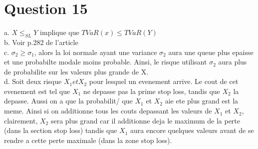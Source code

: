 \section{Question 15}
a. $X \leq_{SL} Y$ implique que $TVaR(x) \leq TVaR(Y)$\\

b. Voir p.282 de l'article\\

c. $\sigma_2 \geq \sigma_1$, alors la loi normale ayant une variance $\sigma_2$ aura une queue plus epaisse et une probabilte modale moins probable. Ainsi, le risque utilisant $\sigma_2$ aura plus de probabilite sur les valeurs plus grande de X.\\

d. Soit deux risque $X_1 et X_2$ pour lesquel un evenement arrive. Le cout de cet evenement est tel que $X_1$ ne depasse pas la prime stop loss, tandis  que $X_2$ la depasse. Aussi on a que la probabilit/ que $X_1$ et $X_2$ aie ete plus grand est la meme. Ainsi si on additionne tous les couts depassant les valeurs de $X_1$ et $X_2$, clairement, $X_2$ sera plus grand car il additionne deja le maximum de la perte (dans la section stop loss) tandis que $X_1$ aura encore quelques valeurs avant de se rendre a cette perte maximale (dans la zone stop loss).\\